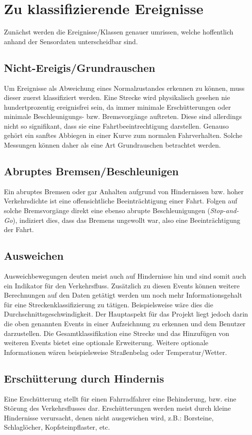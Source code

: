 \section{Zu klassifizierende Ereignisse}
Zunächst werden die Ereignisse/Klassen genauer umrissen, welche hoffentlich anhand der Sensordaten unterscheidbar sind.

\subsection{Nicht-Ereigis/Grundrauschen}
Um Ereignisse als Abweichung eines Normalzustandes erkennen zu können, muss dieser zuerst klassifiziert werden.
Eine Strecke wird physikalisch gesehen nie hundertprozentig ereignisfrei sein, da immer minimale Erschütterungen oder minimale Beschleunigungs- bzw. Bremsvorgänge auftreten.
Diese sind allerdings nicht so signifikant, dass sie eine Fahrtbeeintrechtigung darstellen.
Genauso gehört ein sanftes Abbiegen in einer Kurve zum normalen Fahrverhalten.
Solche Messungen können daher als eine Art Grundrauschen betrachtet werden.

\subsection{Abruptes Bremsen/Beschleunigen}
Ein abruptes Bremsen oder gar Anhalten aufgrund von Hindernissen bzw. hoher Verkehrsdichte ist eine offensichtliche Beeinträchtigung einer Fahrt.
Folgen auf solche Bremsvorgänge direkt eine ebenso abrupte Beschleunigungen (\textit{Stop-and-Go}), indiziert dies, dass das Bremens ungewollt war, also eine Beeinträchtigung der Fahrt.

\subsection{Ausweichen}
Ausweichbewegungen deuten meist auch auf Hindernisse hin und sind somit auch ein Indikator für den Verkehrsfluss. 
Zusätzlich zu diesen Events können weitere Berechnungen auf den Daten getätigt werden um noch mehr Informationsgehalt für eine Streckenklassifizierung zu tätigen. Beispielsweise wäre dies die Durchschnittsgeschwindigkeit.
Der Hauptaspekt für das Projekt liegt jedoch darin die oben genannten Events in einer Aufzeichnung zu erkennen und dem Benutzer darzustellen. Die Gesamtklassifikation eine Strecke und das Hinzufügen von weiteren Events bietet eine optionale Erweiterung. Weitere optionale Informationen wären beispielsweise Straßenbelag oder Temperatur/Wetter.

\subsection{Erschütterung durch Hindernis}
Eine Erschütterung stellt für einen Fahrradfahrer eine Behinderung, bzw. eine Störung des Verkehrsflusses dar. 
Erschütterungen werden meist durch kleine Hindernisse verursacht, denen nicht ausgewichen wird, z.B.: Borsteine, Schlaglöcher, Kopfsteinpflaster, etc.